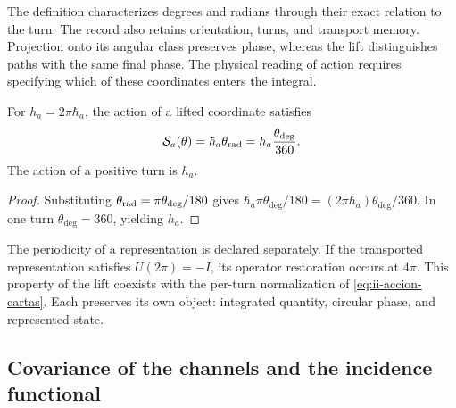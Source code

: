 The definition characterizes degrees and radians through their exact relation
to the turn. The record also retains orientation, turns, and
transport memory. Projection onto its angular class preserves
phase, whereas the lift distinguishes paths with the same
final phase. The physical reading of action requires specifying which of
these coordinates enters the integral.

\begin{proposition}
For \(h_a=2\pi\hbar_a\), the action of a lifted coordinate
satisfies
\begin{equation}
 \mathcal S_a(\theta)
 =\hbar_a\theta_{\rm rad}
 =h_a\frac{\theta_{\deg}}{360}.
 \label{eq:ii-accion-cartas}
\end{equation}
The action of a positive turn is \(h_a\).
\end{proposition}
\begin{proof}
Substituting \(\theta_{\rm rad}=\pi\theta_{\deg}/180\) gives
\(\hbar_a\pi\theta_{\deg}/180
=(2\pi\hbar_a)\theta_{\deg}/360\). In one turn
\(\theta_{\deg}=360\), yielding \(h_a\).
\end{proof}

The periodicity of a representation is declared separately. If the
transported representation satisfies \(U(2\pi)=-I\), its operator
restoration occurs at \(4\pi\). This property of the lift
coexists with the per-turn normalization of
\eqref{eq:ii-accion-cartas}. Each preserves its own object: integrated
quantity, circular phase, and represented state.

\subsection{Covariance of the channels and the incidence functional}

